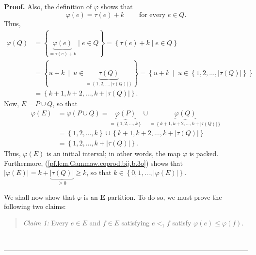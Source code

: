 \documentclass[numbers=enddot,12pt,final,onecolumn,notitlepage,abstracton]{scrartcl}
\theoremstyle{definition}
\newenvironment{statement}{\begin{quote}}{\end{quote}}
\newenvironment{proof}[1][Proof]{\noindent\textbf{#1.} }{\ \rule{0.5em}{0.5em}}
\newenvironment{verlong}{}{}
\newcommand{\EE}{{\mathbf{E}}}
\begin{document}
\begin{verlong}
\begin{proof}
Also, the definition of $\varphi$ shows that%
\begin{equation}
\varphi\left(  e\right)  =\tau\left(  e\right)
+k\ \ \ \ \ \ \ \ \ \ \text{for every }e\in Q.
\label{pf.lem.Gammaw.coprod.bij.b.2o}
\end{equation}
Thus,
\begin{align*}
\varphi\left(  Q\right)
& = \left\{ \underbrace{\varphi\left(e\right)}_{= \tau\left(e\right) + k}
\mid e \in Q \right\} = \left\{ \tau\left(e\right) + k \mid e \in Q \right\} \\
&  =\left\{  u+k\ \mid\ u\in\underbrace{\tau\left(
Q\right)  }_{=\left\{  1,2,\ldots,\left\vert \tau\left( Q \right)  \right\vert
\right\}  }\right\}  =\left\{  u+k\ \mid\ u\in\left\{  1,2,\ldots,\left\vert
\tau\left(  Q\right)  \right\vert \right\}  \right\} \\
&  =\left\{  k+1,k+2,\ldots,k+\left\vert \tau\left( Q \right)  \right\vert
\right\}  .
\end{align*}
Now, $E=P\cup Q$, so that%
\begin{align}
\varphi\left(  E\right)   &  =\varphi\left(  P\cup Q\right)
=\underbrace{\varphi\left(  P\right)  }_{=\left\{  1,2,\ldots,k\right\}  }%
\cup\underbrace{\varphi\left(  Q\right)  }_{=\left\{  k+1,k+2,\ldots
,k+\left\vert \tau\left( Q \right)  \right\vert \right\}  }\nonumber\\
&  =\left\{  1,2,\ldots,k\right\}  \cup\left\{  k+1,k+2,\ldots,k+\left\vert
\tau\left( Q \right)  \right\vert \right\}  \nonumber \\
&=  \left\{  1,2,\ldots,k+\left\vert
\tau\left( Q \right)  \right\vert \right\}  .
\label{pf.lem.Gammaw.coprod.bij.b.3o}%
\end{align}
Thus, $\varphi\left(  E\right)  $ is an initial interval; in other words, the
map $\varphi$ is packed. Furthermore, (\ref{pf.lem.Gammaw.coprod.bij.b.3o})
shows that $\left\vert \varphi\left(  E\right)  \right\vert
=k+\underbrace{\left\vert \tau\left( Q \right)  \right\vert }_{\geq0}\geq k$,
so that $k\in\left\{  0,1,\ldots,\left\vert \varphi\left(  E\right)
\right\vert \right\}  $.

We shall now show that $\varphi$ is an $\EE$-partition. To do so, we
must prove the following two claims:

\begin{statement}
\textit{Claim 1:} Every $e\in E$ and $f\in E$ satisfying $e<_{1}f$ satisfy
$\varphi\left(  e\right)  \leq\varphi\left(  f\right)  $.
\end{statement}


\end{proof}
\end{verlong}
\end{document}
